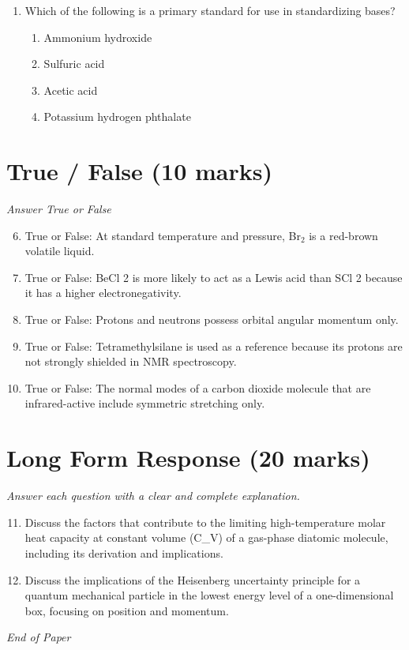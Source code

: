 \documentclass[12pt]{article}
\begin{document}
\begin{enumerate}[label=\arabic*.]
\begin{enumerate}[label=(\alph*)]
    \item mixture of two diastereomers in equal amounts
    \item meso compound
\end{enumerate}
\item Which of the following is a primary standard for use in standardizing bases?
\begin{enumerate}[label=(\alph*)]
    \item Ammonium hydroxide
    \item Sulfuric acid
    \item Acetic acid
    \item Potassium hydrogen phthalate
\end{enumerate}
\end{enumerate}

\section*{True / False (10 marks)}
\textit{Answer True or False}
\begin{enumerate}[label=\arabic*.]
\setcounter{enumi}{5}
\item True or False: At standard temperature and pressure, Br$_{2}$ is a red-brown volatile liquid.
\item True or False: BeCl 2 is more likely to act as a Lewis acid than SCl 2 because it has a higher electronegativity.
\item True or False: Protons and neutrons possess orbital angular momentum only.
\item True or False: Tetramethylsilane is used as a reference because its protons are not strongly shielded in NMR spectroscopy.
\item True or False: The normal modes of a carbon dioxide molecule that are infrared-active include symmetric stretching only.
\end{enumerate}

\section*{Long Form Response (20 marks)}
\textit{Answer each question with a clear and complete explanation.}
\begin{enumerate}[label=\arabic*.]
\setcounter{enumi}{10}
\item Discuss the factors that contribute to the limiting high-temperature molar heat capacity at constant volume (C\_V) of a gas-phase diatomic molecule, including its derivation and implications.
\item Discuss the implications of the Heisenberg uncertainty principle for a quantum mechanical particle in the lowest energy level of a one-dimensional box, focusing on position and momentum.
\end{enumerate}

\vfill
\noindent\textit{End of Paper}
\end{document}
